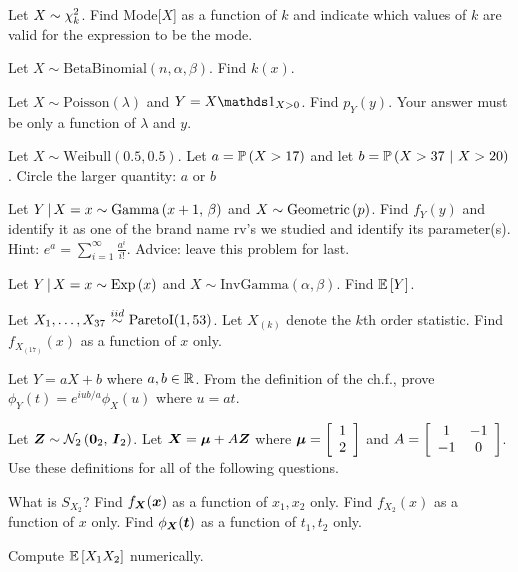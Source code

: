 \documentclass[12pt]{article}
\begin{document}
\begin{enumerate}[(a)]



 Let $X \sim \chi^2_{k}$. Find Mode[$X$] as a function of $k$ and indicate which values of $k$ are valid for the expression to be the mode.

 Let $X \sim \text{BetaBinomial}(n, \alpha, \beta)$. Find $k(x)$.

 Let $X \sim \text{Poisson}(\lambda)$ and $Y = X\indic{X > 0}$. Find $p_Y(y)$. Your answer must be only a function of $\lambda$ and $y$.

 Let $X \sim \text{Weibull}(0.5, 0.5)$. Let $a = \mathbb{P}\left(X > 17\right)$ and let $b = \mathbb{P}\left(X>37~|~X>20\right)$. Circle the larger quantity: $a$ or $b$


 Let $Y\,|\,X = x \sim \mathrm{Gamma}\left(x + 1,\,\beta\right)$ and $X \sim \mathrm{Geometric}\left(p\right)$. Find $f_Y(y)$ and identify it as one of the brand name rv's we studied and identify its parameter(s). Hint: $e^{a} = \displaystyle \sum_{i=1}^\infty \frac{a^i}{i!}$. Advice: leave this problem for last. 

 Let $Y\,|\,X = x \sim \mathrm{Exp}\left(x\right)$ and $X \sim \text{InvGamma}(\alpha,\beta)$. Find $\mathbb{E}\left[Y\right]$.


 Let $X_1, \ldots, X_{37} \iid \text{ParetoI}(1,53)$. Let $X_{(k)}$ denote the $k$th order statistic. Find $f_{X_{(17)}}(x)$ as a function of $x$ only. 


 Let $Y = aX + b$ where $a, b \in \mathbb{R}$. From the definition of the ch.f., prove $\phi_{Y}(t) = e^{iub/a}\phi_X(u)$ where $u = at$. 

\pagebreak
Let $\boldsymbol{Z} \sim \mathcal{N}_{2}\left(\boldsymbol{0}_2,\,\boldsymbol{I}_2\right)$. Let $\boldsymbol{X} = \boldsymbol{\mu} + A\boldsymbol{Z}$ where $\boldsymbol{\mu} = \left[\begin{array}{c} 1 \\ 2 \end{array}\right]$ and $A = \left[\begin{array}{cc} 1 & -1 \\ -1 & 0 \end{array}\right]$. Use these definitions for all of the following questions.


 What is $S_{X_2}$? 
 Find $f_{\boldsymbol{X}}(\boldsymbol{x})$ as a function of $x_1, x_2$ only. 
 Find $f_{X_2}(x)$ as a function of $x$ only. 
 Find $\phi_{\boldsymbol{X}}(\boldsymbol{t})$ as a function of $t_1, t_2$ only. 

 Compute $\mathbb{E}\left[X_1 X_2\right]$ numerically. 


\end{enumerate}
\end{document}
